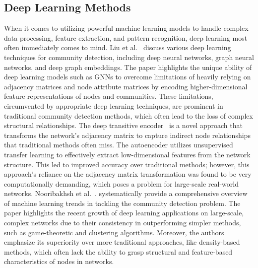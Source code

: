 \documentclass{article}
\begin{document}
\subsection{Deep Learning Methods}
When it comes to utilizing powerful machine learning models to handle complex data processing, feature extraction, and pattern recognition, deep learning most often immediately comes to mind. Liu et al.~\cite{10.5555/3491440.3492133} discuss various deep learning techniques for community detection, including deep neural networks, graph neural networks, and deep graph embeddings. The paper highlights the unique ability of deep learning models such as GNNs to overcome limitations of heavily relying on adjacency matrices and node attribute matrices by encoding higher-dimensional feature representations of nodes and communities. These limitations, circumvented by appropriate deep learning techniques, are prominent in traditional community detection methods, which often lead to the loss of complex structural relationships. The deep transitive encoder~\cite{XIE201975} is a novel approach that transforms the network’s adjacency matrix to capture indirect node relationships that traditional methods often miss. The autoencoder utilizes unsupervised transfer learning to effectively extract low-dimensional features from the network structure. This led to improved accuracy over traditional methods; however, this approach’s reliance on the adjacency matrix transformation was found to be very computationally demanding, which poses a problem for large-scale real-world networks. Nooribakhsh et al.~\cite{Nooribakhsh2024}. systematically provide a comprehensive overview of machine learning trends in tackling the community detection problem. The paper highlights the recent growth of deep learning applications on large-scale, complex networks due to their consistency in outperforming simpler methods, such as game-theoretic and clustering algorithms. Moreover, the authors emphasize its superiority over more traditional approaches, like density-based methods, which often lack the ability to grasp structural and feature-based characteristics of nodes in networks.
\end{document}

